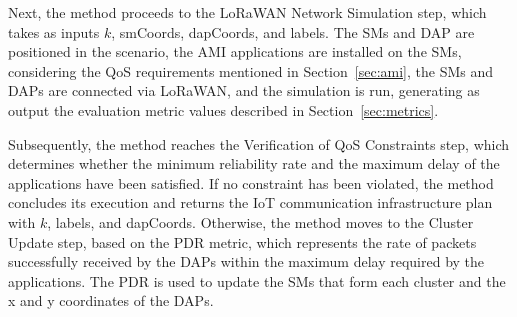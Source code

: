 \documentclass[a4paper,fleqn]{cas-dc}
\begin{document}
Next, the method proceeds to the \gls{LoRaWAN} Network Simulation step, which takes as inputs \( k \), smCoords, dapCoords, and labels. The \gls{SMs} and DAP are positioned in the scenario, the \gls{AMI} applications are installed on the \gls{SMs}, considering the \gls{QoS} requirements mentioned in Section~\ref{sec:ami}, the \gls{SMs} and \gls{DAPs} are connected via \gls{LoRaWAN}, and the simulation is run, generating as output the evaluation metric values described in Section~\ref{sec:metrics}.

Subsequently, the method reaches the Verification of \gls{QoS} Constraints step, which determines whether the minimum reliability rate and the maximum delay of the applications have been satisfied. If no constraint has been violated, the method concludes its execution and returns the IoT communication infrastructure plan with \( k \), labels, and dapCoords. Otherwise, the method moves to the Cluster Update step, based on the \gls{PDR} metric, which represents the rate of packets successfully received by the \gls{DAPs} within the maximum delay required by the applications. The \gls{PDR} is used to update the \gls{SMs} that form each cluster and the x and y coordinates of the \gls{DAPs}.
\end{document}
